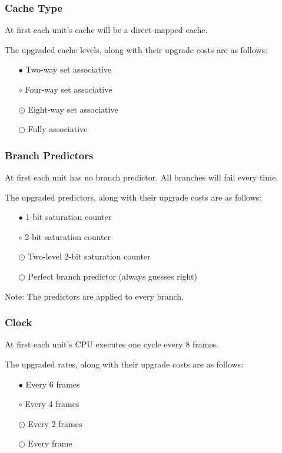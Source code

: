 \documentclass{article}
\begin{document}
\subsubsection*{Cache Type}

At first each unit's cache will be a direct-mapped cache.

The upgraded cache levels, along with their upgrade costs are as follows:

\begin{itemize}[noitemsep]
    \item[$\bullet$] Two-way set associative
    \item[$\circ$] Four-way set associative
    \item[$\odot$] Eight-way set associative
    \item[$\bigcirc$] Fully associative
\end{itemize}

\subsubsection*{Branch Predictors}

At first each unit has no branch predictor. All branches will fail every time.

The upgraded predictors, along with their upgrade costs are as follows:

\begin{itemize}[noitemsep]
    \item[$\bullet$] 1-bit saturation counter
    \item[$\circ$] 2-bit saturation counter
    \item[$\odot$] Two-level 2-bit saturation counter
    \item[$\bigcirc$] Perfect branch predictor (always guesses right)
\end{itemize}

Note: The predictors are applied to every branch.

\subsubsection*{Clock}

At first each unit's CPU executes one cycle every 8 frames.

The upgraded rates, along with their upgrade costs are as follows:

\begin{itemize}[noitemsep]
    \item[$\bullet$] Every 6 frames
    \item[$\circ$] Every 4 frames
    \item[$\odot$] Every 2 frames
    \item[$\bigcirc$] Every frame
\end{itemize}
\end{document}
